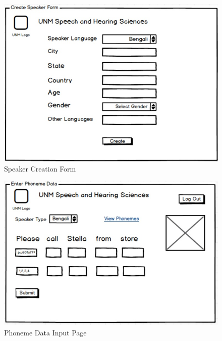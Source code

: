 \documentclass[12pt, a4paper, oneside]{article}
\begin{document}
\begin{figure}
\centering
\includegraphics[width=\textwidth,height=\textheight,keepaspectratio]{./images/Wireframes/CreateSpeaker.jpg}
\caption{Speaker Creation Form}
\end{figure}


\begin{figure}
\centering
\includegraphics[width=\textwidth,height=\textheight,keepaspectratio]{./images/Wireframes/EnterPhoneme.jpg}
\caption{Phoneme Data Input Page}
\end{figure}
\end{document}
